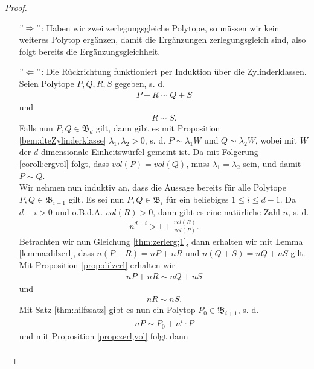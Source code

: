 \documentclass[11pt,titlepage]{article}
\theoremstyle{definition}
\theoremstyle{remark}
\begin{document}
	\begin{proof}
		\noindent
		\begin{itemize}
			\item[$"\Rightarrow"$:] Haben wir zwei zerlegungsgleiche Polytope, so müssen wir kein weiteres Polytop ergänzen, damit die Ergänzungen zerlegungsgleich sind, also folgt bereits die Ergänzungsgleichheit.
			
			\item[$"\Leftarrow"$:] Die Rückrichtung funktioniert per 
			Induktion über die Zylinderklassen. Seien Polytope 
			$P,Q,R,S$ gegeben, s. d. 
			\begin{align}
			P+R\sim Q+S \label{thm:zerlerg;1}
			\end{align}
			und
			\begin{align}
			R\sim S. \label{thm:zerlerg;2}
			\end{align}
			Falls nun $P,Q\in \mathfrak{B}_d$ gilt, dann gibt es mit 
			Proposition \ref{bem:dteZylinderklasse} 
			$\lambda_1,\lambda_2 >0$, s. d. $P\sim \lambda_1 W$ und 
			$Q\sim \lambda_2 W$, wobei mit $W$ der $d$-dimensionale 
			Einheitswürfel gemeint ist. Da mit Folgerung \ref{coroll:ergvol} 
			folgt, dass $vol(P)=vol(Q)$, muss $\lambda_1 =\lambda_2$ sein, und 
			damit $P\sim Q$. \\
			Wir nehmen nun induktiv an, dass die Aussage bereits für alle 
			Polytope $P,Q\in\mathfrak{B}_{i+1}$ gilt. Es sei nun  
			$P,Q\in\mathfrak{B}_i$ für ein beliebiges $1\leq i\leq d-1$. 
			Da $d-i>0$ und o.B.d.A. $vol(R)>0$, dann gibt es eine natürliche Zahl $n$, s. d. 
			\begin{align}
			n^{d-i}>1+\frac{vol(R)}{vol(P)}. \label{thm:zerlerg;3}
			\end{align}
			Betrachten wir nun Gleichung \ref{thm:zerlerg;1}, dann erhalten wir 
			mit Lemma \ref{lemma:dilzerl}, dass $n(P+R)=nP+nR$ und $n(Q+S)=nQ+nS$ 
			gilt. Mit Proposition \ref{prop:dilzerl} erhalten wir 
			\begin{align}
			nP+nR\sim nQ+nS \label{thm:zerlerg;4}
			\end{align}
			und
			\begin{align}
			nR\sim nS. \label{thm:zerlerg;5}
			\end{align}
			Mit Satz \ref{thm:hilfssatz} gibt es nun ein Polytop 
			$P_0\in\mathfrak{B}_{i+1}$, s. d.
			\begin{align}
			nP\sim P_0 +n^i\cdot P \label{thm:zerlerg;6}
			\end{align}
			und mit Proposition \ref{prop:zerl,vol} folgt dann
			\begin{align*}

\end{align*}
\end{itemize}
\end{proof}
\end{document}
